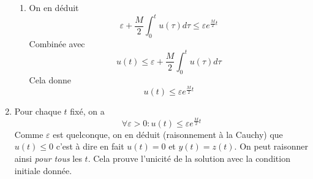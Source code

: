 \begin{enumerate}
\begin{enumerate}
\item On en déduit
\begin{displaymath}
 \varepsilon + \frac{M}{2}\int_0^tu(\tau)d\tau \leq \varepsilon  e^{\frac{M}{2}t}
\end{displaymath}
Combinée avec 
\begin{displaymath}
 u(t)\leq \varepsilon + \frac{M}{2}\int_0^tu(\tau)d\tau
\end{displaymath}
Cela donne
\begin{displaymath}
 u(t) \leq \varepsilon  e^{\frac{M}{2}t}
\end{displaymath}
\end{enumerate}

\item Pour chaque $t$ fixé, on a
\begin{displaymath}
 \forall \varepsilon >0 : u(t) \leq \varepsilon  e^{\frac{M}{2}t}
\end{displaymath}
Comme $\varepsilon$ est quelconque, on en déduit (raisonnement à la Cauchy) que $u(t)\leq 0$ c'est à dire en fait $u(t)=0$ et $y(t)=z(t)$.\newline
On peut raisonner ainsi \emph{pour tous} les $t$. Cela prouve l'unicité de la solution avec la condition initiale donnée.
\end{enumerate}

